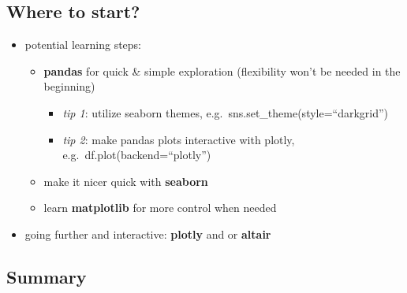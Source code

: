 \documentclass[
  letterpaper,
  DIV=11,
  numbers=noendperiod]{scrartcl}
\providecommand{\tightlist}{%
  \setlength{\itemsep}{0pt}\setlength{\parskip}{0pt}}\usepackage{longtable,booktabs,array}
\begin{document}
\hypertarget{where-to-start}{%
\subsection{Where to start?}\label{where-to-start}}

\begin{itemize}
\tightlist
\item
  potential learning steps:

  \begin{itemize}
  \tightlist
  \item
    \textbf{pandas} for quick \& simple exploration (flexibility won't
    be needed in the beginning)

    \begin{itemize}
    \tightlist
    \item
      \emph{tip 1}: utilize seaborn themes,
      e.g.~sns.set\_theme(style=``darkgrid'')
    \item
      \emph{tip 2}: make pandas plots interactive with plotly,
      e.g.~df.plot(backend=``plotly'')
    \end{itemize}
  \item
    make it nicer quick with \textbf{seaborn}
  \item
    learn \textbf{matplotlib} for more control when needed\\
  \end{itemize}
\item
  going further and interactive: \textbf{plotly} and or \textbf{altair}
\end{itemize}

\hypertarget{summary}{%
\subsection{Summary}\label{summary}}
\end{document}
